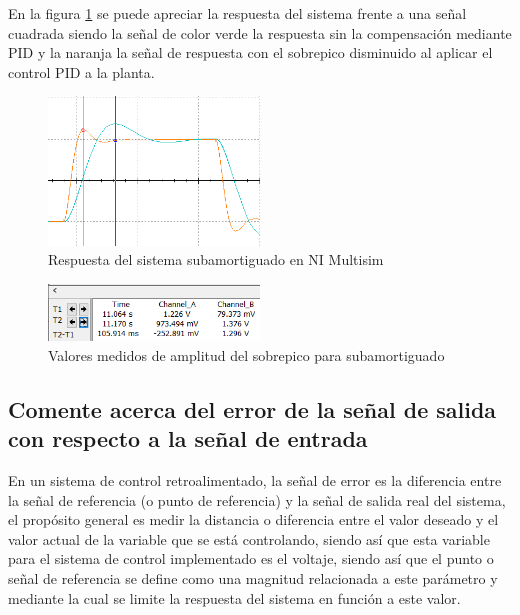 \documentclass[conference]{IEEEtran}
\begin{document}
	En la figura \ref{fig:sub-sobrepico-simulado} se puede apreciar la respuesta del sistema frente a una señal cuadrada siendo la señal de color verde la respuesta sin la compensación mediante PID y la naranja la señal de respuesta con el sobrepico disminuido al aplicar el control PID a la planta.
	\begin{figure}[h]
		\centering
		\includegraphics[width=0.5\textwidth]{media/sub-sobrepico-simulado}
		\caption{Respuesta del sistema subamortiguado en NI Multisim}
		\label{fig:sub-sobrepico-simulado}
	\end{figure}
	
	\begin{figure}
		\centering
		\includegraphics[width=0.5\textwidth]{media/medicion-sub-sobrepico-simulado.png}
		\caption{Valores medidos de amplitud del sobrepico para subamortiguado }
		\label{fig:emdicion-sub-sobrepico-simulado}
	\end{figure}
	
	\subsection{\textbf{Comente acerca del error de la señal de salida con respecto a la señal de entrada}}
	En un sistema de control retroalimentado, la señal de error es la diferencia entre la señal de referencia (o punto de referencia) y la señal de salida real del sistema, el propósito general es medir la distancia o diferencia entre el valor deseado y el valor actual de la variable que se está controlando, siendo así que esta variable para el sistema de control implementado es el voltaje, siendo así que el punto o señal de referencia se define como una magnitud relacionada a este parámetro y mediante la cual se limite la respuesta del sistema en función a este valor.
	
\end{document}
